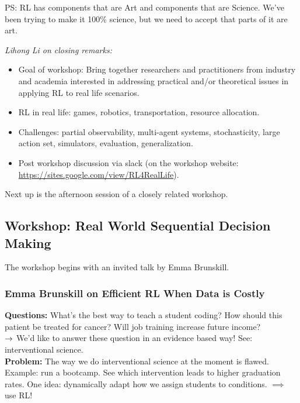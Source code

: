 PS: RL has components that are Art and components that are Science. We've been trying to make it 100\% science, but we need to accept that parts of it are art.

\spacerule


{\it Lihong Li on closing remarks:} 
\begin{itemize}
    \item Goal of workshop: Bring together researchers and practitioners from industry and academia interested in addressing practical and/or theoretical issues in applying RL to real life scenarios. 
    \item RL in real life: games, robotics, transportation, resource allocation.
    \item Challenges: partial observability, multi-agent systems, stochasticity, large action set, simulators, evaluation, generalization.
    \item Post workshop discussion via slack (on the workshop website: \url{https://sites.google.com/view/RL4RealLife}).
\end{itemize}


\spacerule

Next up is the afternoon session of a closely related workshop.

\subsection{Workshop: Real World Sequential Decision Making}
\label{sec:off_pol}

The workshop begins with an invited talk by Emma Brunskill.

\subsubsection{Emma Brunskill on Efficient RL When Data is Costly}

{\bf Questions:} What's the best way to teach a student coding? How should this patient be treated for cancer? Will job training increase future income? \\

$\rightarrow$ We'd like to answer these question in an evidence based way! See: interventional science. \\

{\bf Problem:} The way we do interventional science at the moment is flawed. Example: run a bootcamp. See which intervention leads to higher graduation rates. One idea: dynamically adapt how we assign students to conditions. $\implies$ use RL! \\

